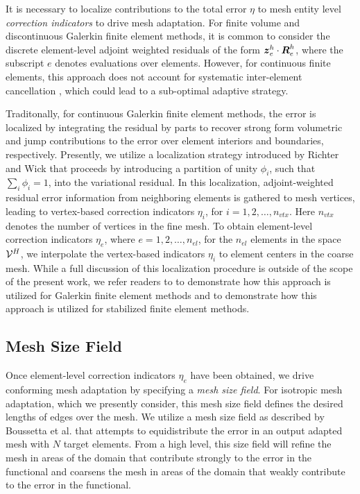 It is necessary to localize contributions to the 
total error $\eta$ to mesh entity level \emph{correction indicators}
to drive mesh adaptation. For finite volume and discontinuous
Galerkin finite element methods, it is common to consider the discrete
element-level adjoint weighted residuals of the form
$\boldsymbol{z}^h_e \cdot \boldsymbol{R}^h_e$, where the subscript $e$ denotes evaluations
over elements. However, for continuous finite elements, this approach
does not account for systematic inter-element cancellation
\cite{fidkowski2011review}, which could lead to a sub-optimal adaptive
strategy.

Traditonally, for continuous Galerkin finite element methods, the
error is localized by integrating the residual by parts to recover
strong form volumetric and jump contributions to the error over
element interiors and boundaries, respectively. Presently, we utilize
a localization strategy introduced by Richter and Wick
\cite{richter2015variational} that proceeds by introducing a
partition of unity $\phi_i$, such that $\sum_i \phi_i = 1$, into the
variational residual. In this localization, adjoint-weighted residual
error information from neighboring elements is gathered to mesh
vertices, leading to vertex-based correction indicators $\eta_i$,
for $i = 1, 2, \dots, n_{vtx}$. Here $n_{vtx}$ denotes the number
of vertices in the fine mesh. To obtain element-level correction
indicators $\eta_e$, where $e = 1,2, \dots, n_{el}$, for the $n_{el}$
elements in the space $\mathcal{V}^H$, we interpolate the vertex-based
indicators $\eta_i$ to element centers in the coarse mesh.
While a full discussion of this localization procedure is outside
of the scope of the present work, we refer readers to
\cite{richter2015variational, wick2016goal} to demonstrate how this
approach is utilized for Galerkin finite element methods and
\cite{granzow2018adjoint} to demonstrate how this approach is
utilized for stabilized finite element methods.

\subsection{Mesh Size Field}

Once element-level correction indicators $\eta_e$ have been obtained, we
drive conforming mesh adaptation by specifying a \emph{mesh size field}.
For isotropic mesh adaptation, which we presently consider, this mesh size
field defines the desired lengths of edges over the mesh. We utilize a mesh
size field as described by Boussetta et al. \cite{boussetta2006adaptive}
that attempts to equidistribute the error in an output adapted mesh with
$N$ target elements. From a high level, this size field will refine the mesh
in areas of the domain that contribute strongly to the error in the functional
and coarsens the mesh in areas of the domain that weakly contribute to the
error in the functional.

